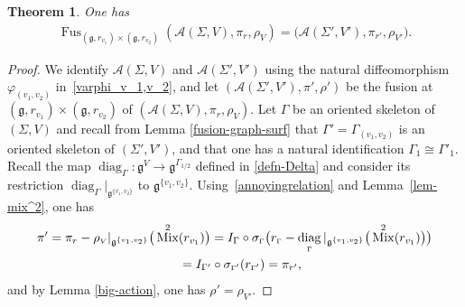 \documentclass[pdftex]{sigma}
\numberwithin{equation}{section}
\newtheorem{Theorem}{Theorem}[section]
\def \g {\mathfrak{a}}
\def \g {\mathfrak{g}}
\def \A {{\mathcal{A}}}
\DeclareMathOperator{\diag}{diag}
\DeclareMathOperator{\Mix}{Mix}
\DeclareMathOperator{\Fus}{Fus}
\def \sV {{\scriptscriptstyle V}}
\def \sGam {{\scriptscriptstyle \Gamma}}
\begin{document}
\begin{Theorem} \label{thm-fuse-mark}One has
\begin{gather*}
\Fus_{(\g, r_{v_1}) \times (\g, r_{v_2})} (\A(\Sigma, V), \pi_r, \rho_\sV) = \big(\A(\Sigma', V'), \pi_{r'}, \rho_{\sV'}\big).
\end{gather*}
\end{Theorem}
\begin{proof}We identify $\A(\Sigma, V)$ and $\A(\Sigma', V')$ using the natural dif\/feomorphism $\varphi_{(v_1, v_2)}$ in~\eqref{varphi_v_1,v_2}, and let $(\A(\Sigma', V'), \pi', \rho')$ be the fusion at $(\g, r_{v_1}) \times (\g, r_{v_2})$ of $(\A(\Sigma, V), \pi_r, \rho_\sV)$. Let $\Gamma$ be an oriented skeleton of $(\Sigma, V)$ and recall from Lemma \ref{fusion-graph-surf} that $\Gamma' = \Gamma_{(v_1, v_2)}$ is an oriented skeleton of $(\Sigma', V')$, and that one has a natural identif\/ication $\Gamma_1 \cong \Gamma'_1$. Recall the map $\diag_{\sGam}\colon \g^{\sV} \to \g^{\sGam_{1/2}}$ def\/ined in \eqref{defn-Delta} and consider its restriction $\diag_{\sGam} |_{\g^{\{v_1, v_2\}}}$ to $\g^{\{v_1, v_2\}}$. Using~\eqref{annoyingrelation} and Lemma~\ref{lem-mix^2}, one has
\begin{gather*}
\pi' = \pi_r - \rho_\sV |_{\g^{\{v_1, v_2\}}}\big(\Mix^2(r_{v_1})\big)
= I_\Gamma \circ \sigma_{\sGam}\big( r_{\sGam} - \diag_{\sGam} |_{\g^{\{v_1, v_2\}}} \big(\Mix^2(r_{v_1})\big)\big)\\
\hphantom{\pi'}{} = I_{\Gamma'} \circ \sigma_{\sGam'}(r_{\sGam'}) = \pi_{r'},
\end{gather*}
and by Lemma \ref{big-action}, one has $\rho' = \rho_{\sV'}$.
\end{proof}
\end{document}
